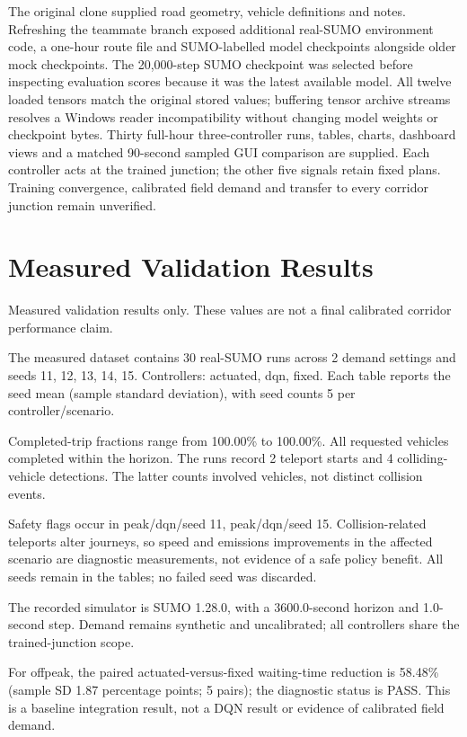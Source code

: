 \documentclass[conference]{IEEEtran}
\begin{document}
The original clone supplied road geometry, vehicle definitions and notes. Refreshing the teammate branch exposed additional real-SUMO environment code, a one-hour route file and SUMO-labelled model checkpoints alongside older mock checkpoints. The 20,000-step SUMO checkpoint was selected before inspecting evaluation scores because it was the latest available model. All twelve loaded tensors match the original stored values; buffering tensor archive streams resolves a Windows reader incompatibility without changing model weights or checkpoint bytes. Thirty full-hour three-controller runs, tables, charts, dashboard views and a matched 90-second sampled GUI comparison are supplied. Each controller acts at the trained junction; the other five signals retain fixed plans. Training convergence, calibrated field demand and transfer to every corridor junction remain unverified.

\section{Measured Validation Results}
Measured validation results only. These values are not a final calibrated corridor performance claim.

The measured dataset contains 30 real-SUMO runs across 2 demand settings and seeds 11, 12, 13, 14, 15. Controllers: actuated, dqn, fixed. Each table reports the seed mean (sample standard deviation), with seed counts 5 per controller/scenario.

Completed-trip fractions range from 100.00\% to 100.00\%. All requested vehicles completed within the horizon. The runs record 2 teleport starts and 4 colliding-vehicle detections. The latter counts involved vehicles, not distinct collision events.

Safety flags occur in peak/dqn/seed 11, peak/dqn/seed 15. Collision-related teleports alter journeys, so speed and emissions improvements in the affected scenario are diagnostic measurements, not evidence of a safe policy benefit. All seeds remain in the tables; no failed seed was discarded.

The recorded simulator is SUMO 1.28.0, with a 3600.0-second horizon and 1.0-second step. Demand remains synthetic and uncalibrated; all controllers share the trained-junction scope.

For offpeak, the paired actuated-versus-fixed waiting-time reduction is 58.48\% (sample SD 1.87 percentage points; 5 pairs); the diagnostic status is PASS. This is a baseline integration result, not a DQN result or evidence of calibrated field demand.
\end{document}
